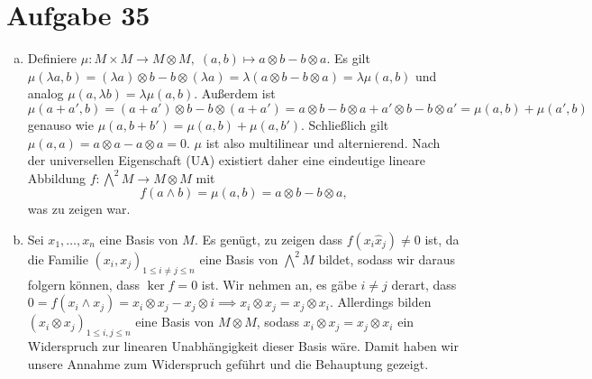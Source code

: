 \documentclass{article}
\theoremstyle{definition}
\begin{document}
\section*{Aufgabe 35}
\begin{enumerate}[(a)]
    \item Definiere $\mu\colon M\times M \to M \otimes M,\; (a,b) \mapsto a\otimes b - b \otimes a$.
          Es gilt $\mu(\lambda a, b) = (\lambda a)\otimes b - b\otimes (\lambda a) = \lambda (a\otimes b - b\otimes a) = \lambda\mu(a,b)$ und analog $\mu(a, \lambda b) = \lambda\mu(a,b)$. Außerdem ist $\mu(a + a',b) = (a + a')\otimes b - b\otimes (a + a') = a\otimes b - b\otimes a + a'\otimes b - b\otimes a' = \mu(a,b) + \mu(a',b)$ genauso wie $\mu(a, b + b') = \mu(a,b) + \mu(a, b')$. Schließlich gilt $\mu(a,a) = a\otimes a - a\otimes a = 0$. $\mu$ ist also multilinear und alternierend.
          Nach der universellen Eigenschaft (UA) existiert daher eine eindeutige lineare Abbildung $f\colon \bigwedge^2 M \to M \otimes M$ mit
          \[f(a\wedge b) = \mu(a,b) = a\otimes b - b \otimes a,\] was zu zeigen war.
    \item Sei $x_1,\dots,x_n$ eine Basis von $M$. Es genügt, zu zeigen dass $f(x_i\hat x_j) \neq 0$ ist, da die Familie $(x_i,x_j)_{1\le i\neq j\le n}$ eine Basis von $\bigwedge^2 M$ bildet, sodass wir daraus folgern können, dass $\ker f = 0$ ist. Wir nehmen an, es gäbe $i\neq j$ derart, dass $0 = f(x_i \wedge x_j) = x_i\otimes x_j - x_j\otimes i \implies x_i\otimes x_j = x_j\otimes x_i$. Allerdings bilden $(x_i\otimes x_j)_{1\le i, j\le n}$ eine Basis von $M\otimes M$, sodass $x_i \otimes x_j = x_j\otimes x_i$ ein Widerspruch zur linearen Unabhängigkeit dieser Basis wäre. Damit haben wir unsere Annahme zum Widerspruch geführt und die Behauptung gezeigt.
\end{enumerate}
\end{document}

